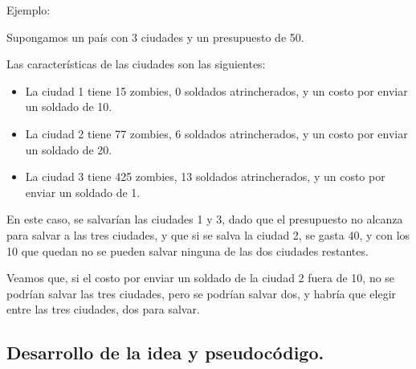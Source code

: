 Ejemplo:

Supongamos un país con 3 ciudades y un presupuesto de 50.

Las características de las ciudades son las siguientes:
\begin{itemize}
	\item La ciudad 1 tiene 15 zombies, 0 soldados atrincherados, y un costo por enviar un soldado de 10.
	\item La ciudad 2 tiene 77 zombies, 6 soldados atrincherados, y un costo por enviar un soldado de 20.
	\item La ciudad 3 tiene 425 zombies, 13 soldados atrincherados, y un costo por enviar un soldado de 1.
\end{itemize}

En este caso, se salvarían las ciudades 1 y 3, dado que el presupuesto no alcanza para salvar a las tres ciudades, y que si se salva la ciudad 2, se gasta 40, y con los 10 que quedan no se pueden salvar ninguna de las dos ciudades restantes.

Veamos que, si el costo por enviar un soldado de la ciudad 2 fuera de 10, no se podrían salvar las tres ciudades, pero se podrían salvar dos, y habría que elegir entre las tres ciudades, dos para salvar.

\vspace*{0.6cm}
\subsection{Desarrollo de la idea y pseudocódigo.}

\vspace*{0.3cm}


